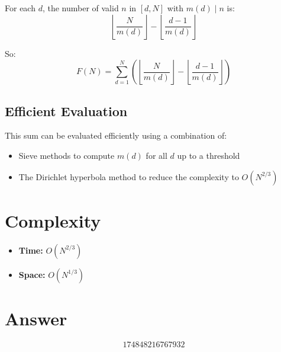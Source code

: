 \documentclass[12pt]{article}
\begin{document}
For each $d$, the number of valid $n$ in $[d, N]$ with $m(d) \mid n$ is:
\[
\left\lfloor \frac{N}{m(d)} \right\rfloor - \left\lfloor \frac{d-1}{m(d)} \right\rfloor
\]

So:
\[
F(N) = \sum_{d=1}^{N} \left( \left\lfloor \frac{N}{m(d)} \right\rfloor - \left\lfloor \frac{d-1}{m(d)} \right\rfloor \right)
\]

\subsection{Efficient Evaluation}

This sum can be evaluated efficiently using a combination of:
\begin{itemize}
\item Sieve methods to compute $m(d)$ for all $d$ up to a threshold
\item The Dirichlet hyperbola method to reduce the complexity to $O(N^{2/3})$
\end{itemize}

\section{Complexity}

\begin{itemize}
\item \textbf{Time:} $O(N^{2/3})$
\item \textbf{Space:} $O(N^{1/3})$
\end{itemize}

\section{Answer}

\[
\boxed{174848216767932}
\]
\end{document}
